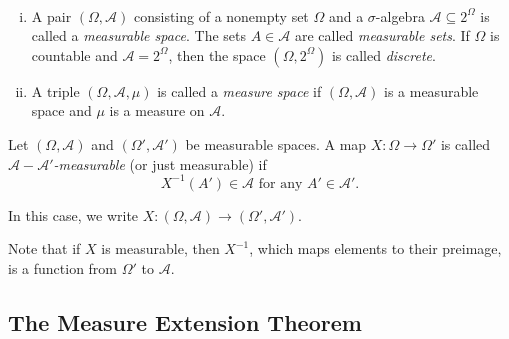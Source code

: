 \begin{definition}
~
\begin{enumerate}[(i)]
    \item A pair $(\Omega,\mathcal{A})$ consisting of a nonempty set $\Omega$ and a $\sigma$-algebra $\mathcal{A}\subseteq2^\Omega$ is called a \textit{measurable space}. The sets $A\in\mathcal{A}$ are called \textit{measurable sets}. If $\Omega$ is countable and $\mathcal{A}=2^\Omega$, then the space $(\Omega,2^\Omega)$ is called \textit{discrete}.
    
    \item A triple $(\Omega,\mathcal{A},\mu)$ is called a \textit{measure space} if $(\Omega,\mathcal{A})$ is a measurable space and $\mu$ is a measure on $\mathcal{A}$.
\end{enumerate}
\end{definition}

\begin{definition}
    Let $(\Omega,\mathcal{A})$ and $(\Omega',\mathcal{A}')$ be measurable spaces. A map $X:\Omega\to\Omega'$ is called \textit{$\mathcal{A}-\mathcal{A}'$-measurable} (or just measurable) if
    $$X^{-1}(A')\in\mathcal{A}\text{ for any }A'\in\mathcal{A}'.$$
\end{definition}

In this case, we write $X:(\Omega,\mathcal{A})\to(\Omega',\mathcal{A}')$.

Note that if $X$ is measurable, then $X^{-1}$, which maps elements to their preimage, is a function from $\Omega'$ to $\mathcal{A}$.

\subsection{The Measure Extension Theorem}

